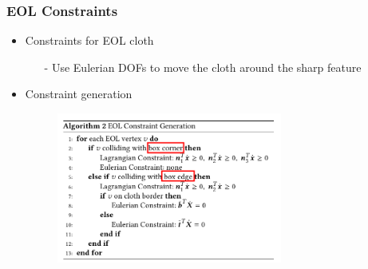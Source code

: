 \documentclass[serif,mathserif, 12pt]{beamer}
\begin{document}
\begin{frame}
  \frametitle{EOL Constraints}
  \begin{itemize}
  \item Constraints for EOL cloth
    \begin{itemize}
    \item[-] Use Eulerian DOFs to move the cloth around the sharp feature
    \end{itemize}
    \pause
  \item Constraint generation
    \begin{figure}
      \centering
      \includegraphics[width=0.7\textwidth]{img/gen_cons}
    \end{figure}
  \end{itemize}
\end{frame}
\end{document}
